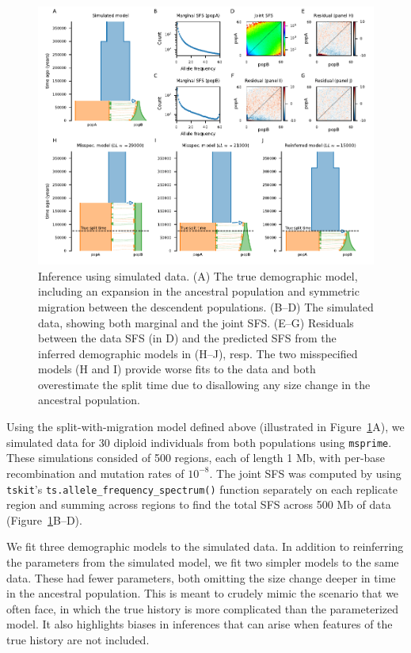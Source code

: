 \documentclass[]{article}
\newcommand{\msprime}{\texttt{msprime}\xspace}
\newcommand{\tskit}{\texttt{tskit}\xspace}
\begin{document}
\begin{figure}[t!]
    \includegraphics{../example1/fig1.pdf}
    \caption{
        Inference using simulated data. (A) The true demographic model,
        including an expansion in the ancestral population and symmetric
        migration between the descendent populations. (B--D) The simulated
        data, showing both marginal and the joint SFS. (E--G) Residuals
        between the data SFS (in D) and the predicted SFS from the inferred
        demographic models in (H--J), resp.  The two misspecified models (H and
        I) provide worse fits to the data and both overestimate the split time
        due to disallowing any size change in the ancestral population.
    }
    \label{fig:im}
\end{figure}

Using the split-with-migration model defined above (illustrated in
Figure~\ref{fig:im}A), we simulated data for 30 diploid individuals from both
populations using \msprime \citep{baumdicker2022efficient}. These simulations
consided of 500 regions, each of length 1 Mb, with per-base recombination and
mutation rates of $10^{-8}$. The joint SFS was computed by using \tskit's
\texttt{ts.allele\_frequency\_spectrum()} function separately on each replicate
region and summing across regions to find the total SFS across 500 Mb of data
(Figure~\ref{fig:im}B--D).

We fit three demographic models to the simulated data. In addition to
reinferring the parameters from the simulated model, we fit two simpler models
to the same data. These had fewer parameters, both omitting the size change
deeper in time in the ancestral population. This is meant to crudely mimic the
scenario that we often face, in which the true history is more complicated than
the parameterized model. It also highlights biases in inferences that can arise
when features of the true history are not included.
\end{document}
